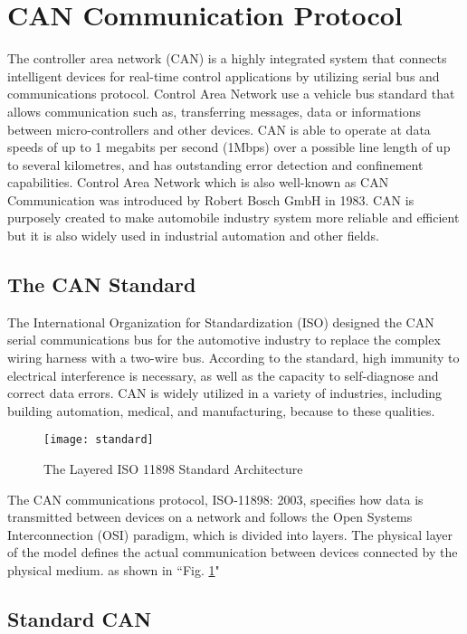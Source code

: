 \section{CAN Communication Protocol}

The controller area network (CAN) is a highly integrated system that connects intelligent devices for  real-time control applications by utilizing serial bus and communications protocol. Control Area Network use a vehicle bus standard that allows communication such as, transferring messages, data or informations between micro-controllers and other devices. CAN is able to operate at data speeds of up to 1 megabits per second (1Mbps) over a possible line length of up to several kilometres, and has outstanding error detection and confinement capabilities. Control Area Network which is also well-known as CAN Communication was introduced by Robert Bosch GmbH in 1983. CAN is purposely created to make automobile industry system more reliable and efficient but it is also widely used in industrial automation and other fields. 
\subsection{The CAN Standard }

The International Organization for Standardization (ISO) designed the CAN serial communications bus for the automotive industry to replace the complex wiring harness with a two-wire bus. According to the standard, high immunity to electrical interference is necessary, as well as the capacity to self-diagnose and correct data errors. CAN is widely utilized in a variety of industries, including building automation, medical, and manufacturing, because to these qualities.

\begin{figure}[h]
    \centering
    \texttt{[image: standard]}
    \caption{The Layered ISO 11898 Standard Architecture \cite{b5}}
    \label{fig:standard}
\end{figure}

The CAN communications protocol, ISO-11898: 2003, specifies how data is transmitted between devices on a network and follows the Open Systems Interconnection (OSI) paradigm, which is divided into layers. The physical layer of the model defines the actual communication between devices connected by the physical medium. as shown in ``Fig. \ref{fig:standard}"

\subsection{Standard CAN }

